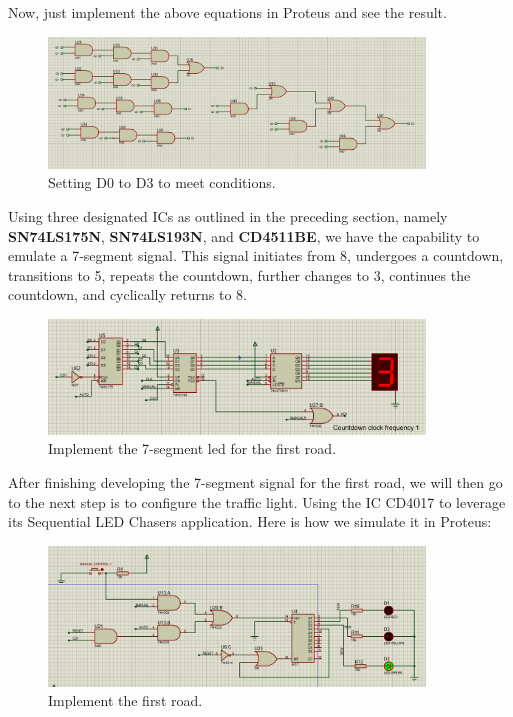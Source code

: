 \documentclass{article}
\begin{document}
Now, just implement the above equations in Proteus and see the result.\par
\begin{figure}[h]
    \centering
    \includegraphics[width=10cm]{Pic/Proteus/175N_Proteus_0.png}
    \caption{Setting D0 to D3 to meet conditions.}
    \label{fig:enter-label}
\end{figure}
\newpage

Using three designated ICs as outlined in the preceding section, namely \textbf{SN74LS175N}, \textbf{SN74LS193N}, and \textbf{CD4511BE}, we have the capability to emulate a 7-segment signal. This signal initiates from 8, undergoes a countdown, transitions to 5, repeats the countdown, further changes to 3, continues the countdown, and cyclically returns to 8.\par

\begin{figure}[h]
    \centering
    \includegraphics[width=10cm]{Pic/Proteus/175N_Proteus_1.png}
    \caption{Implement the 7-segment led for the first road.}
    \label{fig:enter-label}
\end{figure}

After finishing developing the 7-segment signal for the first road, we will then go to the next step is to configure the traffic light. Using the IC CD4017 to leverage its Sequential LED Chasers application. Here is how we simulate it in Proteus:\par
\begin{figure}[h]
    \centering
    \includegraphics[width=10cm]{Pic/Proteus/4017_Proteus_0.png}
    \caption{Implement the first road.}
    \label{fig:enter-label}
\end{figure}
\end{document}
